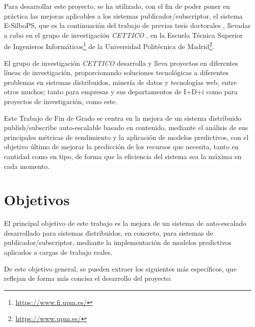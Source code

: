 Para desarrollar este proyecto, se ha utilizado, con el fin de poder poner en 
práctica las mejoras aplicables a los sistemas publicador/subscriptor, el 
sistema E-SilboPS, que es la continuación del trabajo de previas 
tesis doctorales \cite{thesis:tesisVictor}\cite{thesis:tesisSVavassori},
llevadas a cabo en el grupo de investigación \textit{CETTICO} \cite{web:cettico},
en la Escuela Técnica Superior de Ingenieros 
Informáticos\footnote{\href{https://www.fi.upm.es/}{https://www.fi.upm.es/}} 
de la Universidad Politécnica de 
Madrid\footnote{\href{https://www.upm.es/}{https://www.upm.es/}}.

El grupo de investigación \textit{CETTICO} desarrolla y 
lleva proyectos en diferentes líneas de investigación, proporcionando 
soluciones tecnológicas a diferentes problemas en sistemas distribuidos, 
minería de datos y tecnologías web, entre otros muchos; tanto para empresas 
y sus departamentos de I+D+i como para proyectos de investigación, como este.

Este Trabajo de Fin de Grado se centra en la mejora de un sistema 
distribuido publish/subscribe auto-escalable basado en contenido, mediante el
análisis de sus principales métricas de rendimiento y la aplicación de modelos
predictivos, con el objetivo último de mejorar la predicción de los recursos 
que necesita, tanto en cantidad como en tipo, de forma que la eficiencia del 
sistema sea la máxima en cada momento.



\section{Objetivos} \label{sct:intro_objetivos}

El principal objetivo de este trabajo es la mejora de un sistema de 
auto-escalado desarrollado para sistemas distribuidos, en concreto, para 
sistemas de publicador/subscriptor, mediante la implementación de modelos 
predictivos aplicados a cargas de trabajo reales.

De este objetivo general, se pueden extraer los siguientes más específicos, que
reflejan de forma más concisa el desarrollo del proyecto:

